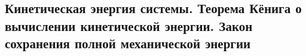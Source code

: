 

\subsection{Кинетическая энергия системы. Теорема Кёнига о вычислении кинетической энергии. Закон сохранения полной механической энергии}



